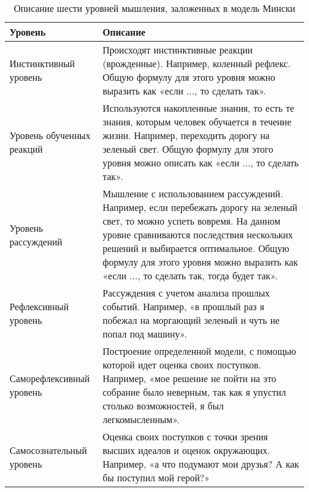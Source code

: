 \begin{table} [htbp]
  \centering
  \parbox{15cm}{\caption{Описание шести уровней мышления, заложенных в модель Мински}\label{ThinkingLevelDescription}}
  \begin{tabular}{| p{5cm} | p{11cm} |}
  
  \hline
\textbf{Уровень} & \textbf{Описание} \\
  \hline
  
Инстинктивный уровень & Происходят инстинктивные реакции (врожденные). Например, коленный рефлекс. Общую формулу для этого уровня можно выразить как «если ..., то сделать так». \\
  \hline

Уровень обученных реакций & Используются накопленные знания, то есть те знания, которым человек обучается в течение жизни. Например, переходить дорогу на зеленый свет. Общую формулу для этого уровня можно описать как «если ..., то сделать так». \\
  \hline

Уровень рассуждений & Мышление с использованием рассуждений. Например, если перебежать дорогу на зеленый свет, то можно успеть вовремя. На данном уровне сравниваются последствия нескольких решений и выбирается оптимальное. Общую формулу для этого уровня можно выразить как «если ..., то сделать так, тогда будет так». \\
  \hline

Рефлексивный уровень & Рассуждения с учетом анализа прошлых событий. Например, «в прошлый раз я побежал на моргающий зеленый и чуть не попал под машину». \\

  \hline
  Саморефлексивный уровень & Построение определенной модели, с помощью которой идет оценка своих поступков. Например, «мое решение не пойти на это собрание было неверным, так как я упустил столько возможностей, я был легкомысленным». \\
  \hline
  Самосознательный уровень & Оценка своих поступков с точки зрения высших идеалов и оценок окружающих. Например, «а что подумают мои друзья? А как бы поступил мой герой?» \\
  \hline
  
  \end{tabular}
\end{table}


